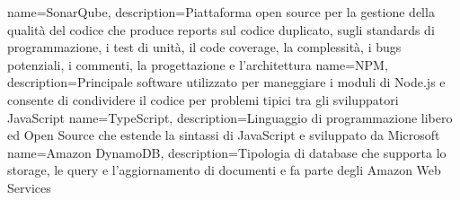  {
	name=SonarQube,
	description={Piattaforma open source per la gestione della qualità del codice che produce reports sul codice duplicato, sugli standards di programmazione, i test di unità, il code coverage, la complessità, i bugs potenziali, i commenti, la progettazione e l’architettura}
}
 {
	name=NPM,
	description={Principale software utilizzato per maneggiare i moduli di Node.js e consente di condividere il codice per problemi tipici tra gli sviluppatori JavaScript}
}
 {
	name=TypeScript,
	description={Linguaggio di programmazione libero ed Open Source che estende la sintassi di JavaScript e sviluppato da Microsoft}
}
 {
	name=Amazon DynamoDB,
	description={Tipologia di database che supporta lo storage, le query e l'aggiornamento di documenti e fa parte degli Amazon Web Services}
}